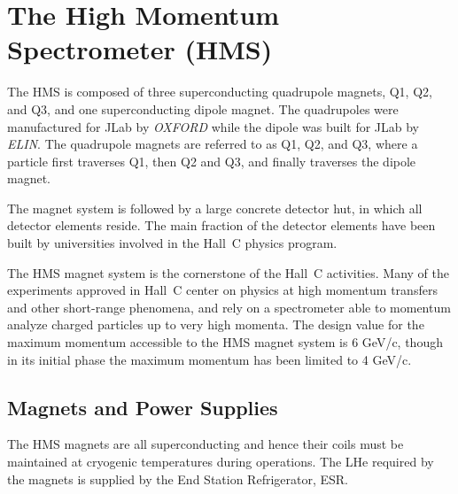 %
%
%
%
%
%
%
%
%
%



\section{The High Momentum Spectrometer (HMS) }

The HMS is composed of three superconducting quadrupole magnets,
Q1, Q2, and Q3, and one superconducting dipole magnet. The quadrupoles
were manufactured for JLab by {\em OXFORD} while the dipole was built for 
JLab by {\em ELIN}.
The quadrupole magnets are referred to as Q1, Q2, and Q3, where a particle first traverses 
Q1, then Q2 and Q3, and finally traverses the dipole magnet.

The magnet system is followed by a large concrete detector hut, in which all
detector elements reside. The main fraction of the detector elements have been
built by universities involved in the Hall~C physics program.

The HMS magnet system is the cornerstone of the Hall~C activities.
Many of the experiments approved in Hall~C center on physics at high
momentum transfers and other short-range phenomena, and rely on a spectrometer
able to momentum analyze charged particles up to very high momenta.
The design value for the maximum momentum accessible to the HMS magnet
system is 6 GeV/c, though in its initial phase the maximum momentum
has been limited to 4 GeV/c.


\subsection{Magnets and Power Supplies}

The HMS magnets are all
superconducting and hence their coils must be maintained at
cryogenic temperatures during operations. The LHe required by the magnets
is supplied by the End Station Refrigerator, ESR.

